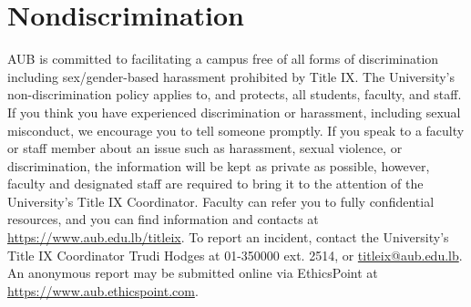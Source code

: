 \documentclass[10pt,a4paper,american]{exam}
\begin{document}
\section{Nondiscrimination}
AUB is committed to facilitating a campus free of all forms of discrimination including sex/gender-based harassment prohibited by Title IX. The University's non-discrimination policy applies to, and protects, all students, faculty, and staff. If you think you have experienced discrimination or harassment, including sexual misconduct, we encourage you to tell someone promptly. If you speak to a faculty or staff member about an issue such as harassment, sexual violence, or discrimination, the information will be kept as private as possible, however, faculty and designated staff are required to bring it to the attention of the University's Title IX Coordinator. Faculty can refer you to fully confidential resources, and you can find information and contacts at \url{https://www.aub.edu.lb/titleix}. To report an incident, contact the University's Title IX Coordinator Trudi Hodges at 01-350000 ext. 2514, or
\href{mailto:titleix@aub.edu.lb}{titleix@aub.edu.lb}. An anonymous report may be submitted online via EthicsPoint at \url{https://www.aub.ethicspoint.com}.
\end{document}

